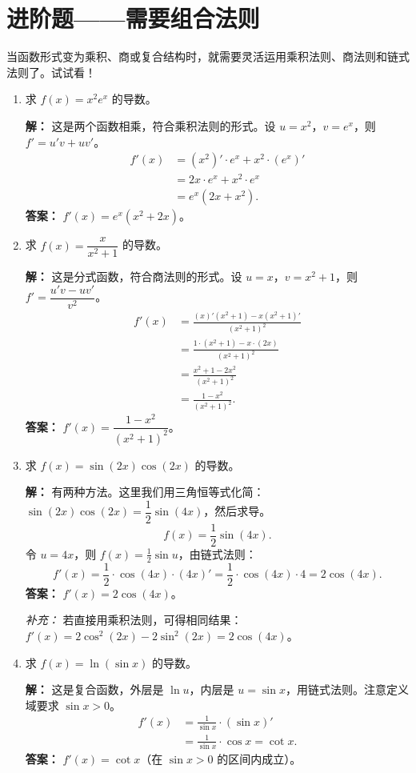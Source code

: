 \documentclass[10pt]{article}
\begin{document}
\section{进阶题——需要组合法则}
当函数形式变为乘积、商或复合结构时，就需要灵活运用乘积法则、商法则和链式法则了。试试看！

\begin{enumerate}[label=\arabic*., resume]
    \item 求 $f(x) = x^2 e^x$ 的导数。
    
    \textbf{解：} 这是两个函数相乘，符合乘积法则的形式。设 $u=x^2$，$v=e^x$，则 $f' = u'v + uv'$。
    \begin{align*}
        f'(x) &= (x^2)' \cdot e^x + x^2 \cdot (e^x)' \\
        &= 2x \cdot e^x + x^2 \cdot e^x \\
        &= e^x (2x + x^2).
    \end{align*}
    \textbf{答案：} $f'(x) = e^x (x^2 + 2x)$。

    \item 求 $f(x) = \dfrac{x}{x^2+1}$ 的导数。
    
    \textbf{解：} 这是分式函数，符合商法则的形式。设 $u = x$，$v = x^2+1$，则 $f' = \dfrac{u'v - uv'}{v^2}$。
    \begin{align*}
        f'(x) &= \frac{(x)' (x^2+1) - x (x^2+1)'}{(x^2+1)^2} \\
        &= \frac{1 \cdot (x^2+1) - x \cdot (2x)}{(x^2+1)^2} \\
        &= \frac{x^2+1 - 2x^2}{(x^2+1)^2} \\
        &= \frac{1 - x^2}{(x^2+1)^2}.
    \end{align*}
    \textbf{答案：} $f'(x) = \dfrac{1 - x^2}{(x^2+1)^2}$。

    \item 求 $f(x) = \sin(2x) \cos(2x)$ 的导数。
    
    \textbf{解：} 有两种方法。这里我们用三角恒等式化简：$\sin(2x)\cos(2x) = \dfrac{1}{2}\sin(4x)$，然后求导。
    $$f(x) = \frac{1}{2}\sin(4x).$$
    令 $u=4x$，则 $f(x) = \frac{1}{2}\sin u$，由链式法则：
    $$f'(x) = \frac{1}{2} \cdot \cos(4x) \cdot (4x)' = \frac{1}{2} \cdot \cos(4x) \cdot 4 = 2\cos(4x).$$
    \textbf{答案：} $f'(x) = 2\cos(4x)$。
    
    \textit{补充：} 若直接用乘积法则，可得相同结果：$f'(x) = 2\cos^2(2x) - 2\sin^2(2x) = 2\cos(4x)$。

    \item 求 $f(x) = \ln(\sin x)$ 的导数。
    
    \textbf{解：} 这是复合函数，外层是 $\ln u$，内层是 $u = \sin x$，用链式法则。注意定义域要求 $\sin x > 0$。
    \begin{align*}
        f'(x) &= \frac{1}{\sin x} \cdot (\sin x)' \\
        &= \frac{1}{\sin x} \cdot \cos x = \cot x.
    \end{align*}
    \textbf{答案：} $f'(x) = \cot x$（在 $\sin x > 0$ 的区间内成立）。
\end{enumerate}
\end{document}
